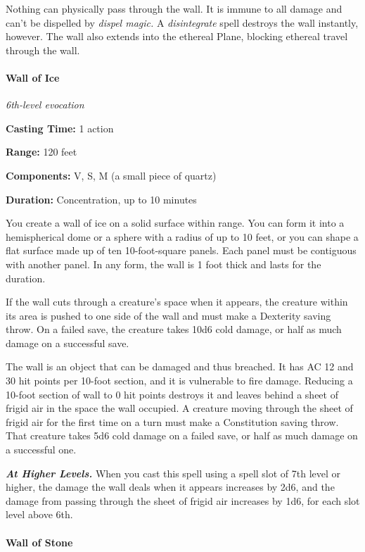 \documentclass[
]{article}
\begin{document}
Nothing can physically pass through the wall. It is immune to all damage
and can't be dispelled by \emph{dispel magic.} A \emph{disintegrate}
spell destroys the wall instantly, however. The wall also extends into
the ethereal Plane, blocking ethereal travel through the wall.

\hypertarget{wall-of-ice}{%
\paragraph{Wall of Ice}\label{wall-of-ice}}

\emph{6th-level evocation}

\textbf{Casting Time:} 1 action

\textbf{Range:} 120 feet

\textbf{Components:} V, S, M (a small piece of quartz)

\textbf{Duration:} Concentration, up to 10 minutes

You create a wall of ice on a solid surface within range. You can form
it into a hemispherical dome or a sphere with a radius of up to 10 feet,
or you can shape a flat surface made up of ten 10-foot-square panels.
Each panel must be contiguous with another panel. In any form, the wall
is 1 foot thick and lasts for the duration.

If the wall cuts through a creature's space when it appears, the
creature within its area is pushed to one side of the wall and must make
a Dexterity saving throw. On a failed save, the creature takes 10d6 cold
damage, or half as much damage on a successful save.

The wall is an object that can be damaged and thus breached. It has AC
12 and 30 hit points per 10-foot section, and it is vulnerable to fire
damage. Reducing a 10-foot section of wall to 0 hit points destroys it
and leaves behind a sheet of frigid air in the space the wall occupied.
A creature moving through the sheet of frigid air for the first time on
a turn must make a Constitution saving throw. That creature takes 5d6
cold damage on a failed save, or half as much damage on a successful
one.

\emph{\textbf{At Higher Levels.}} When you cast this spell using a spell
slot of 7th level or higher, the damage the wall deals when it appears
increases by 2d6, and the damage from passing through the sheet of
frigid air increases by 1d6, for each slot level above 6th.

\hypertarget{wall-of-stone}{%
\paragraph{Wall of Stone}\label{wall-of-stone}}
\end{document}
